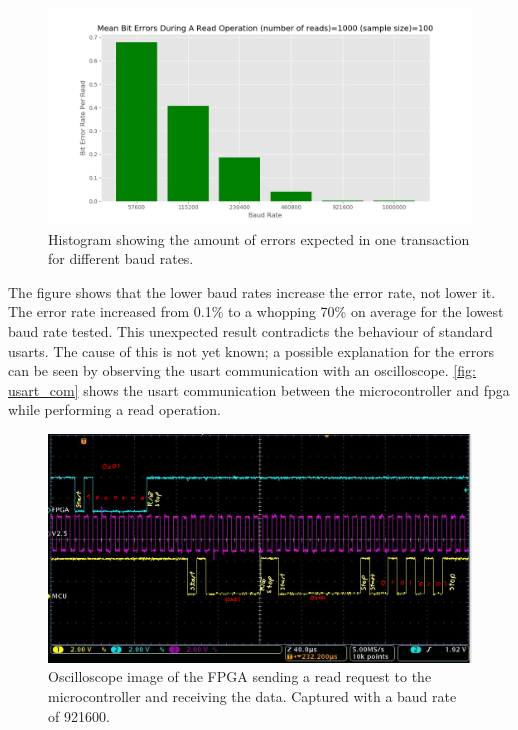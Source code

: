 \documentclass[main.tex]{subfiles}
\begin{document}
\begin{figure}[!ht]
    \centering
    \includegraphics[width=18cm]{images/baud_error_rate.png}
    \caption{Histogram showing the amount of errors expected in one transaction for different baud rates.}
    \label{fig: baud_error}
\end{figure}
\FloatBarrier

The figure shows that the lower baud rates increase the error rate, not lower it. The error rate increased from 0.1\% to a whopping 70\% on average for the lowest baud rate tested. This unexpected result contradicts the behaviour of standard \gls{usart}s. The cause of this is not yet known; a possible explanation for the errors can be seen by observing the \gls{usart} communication with an oscilloscope. \autoref{fig: usart_com} shows the \gls{usart} communication between the microcontroller and \gls{fpga} while performing a read operation.

\begin{figure}[!ht]
    \centering
    \includegraphics[width=18cm]{images/USARTTransaction.png}
    \caption{Oscilloscope image of the FPGA sending a read request to the microcontroller and receiving the data. Captured with a baud rate of 921600.}
    \label{fig: usart_com}
\end{figure}
\FloatBarrier
\end{document}
